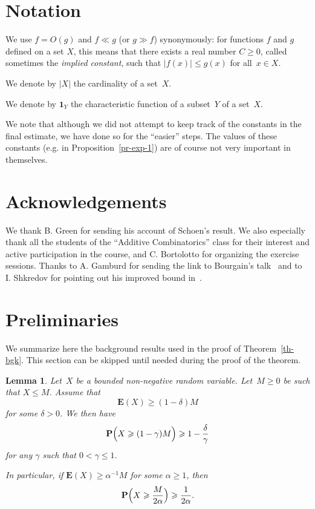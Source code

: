 \documentclass[12pt]{amsart}
\renewcommand{\leq}{\leqslant}
\renewcommand{\geq}{\geqslant}
\numberwithin{equation}{section}
\newcommand{\proba}{\mathbf{P}}
\newcommand{\expect}{\mathbf{E}}
\newcommand{\charfun}{\mathbf{1}}
\theoremstyle{plain}
\newtheorem{lemma}[theorem]{Lemma}
\theoremstyle{remark}
\theoremstyle{definition}
\renewcommand{\geq}{\geqslant}
\renewcommand{\leq}{\leqslant}
\begin{document}
\section*{Notation} We use $f=O(g)$ and $f\ll g$ (or $g\gg f$)
synonymously: for functions $f$ and $g$ defined on a set $X$, this means
that there exists a real number $C\geq 0$, called sometimes the
\emph{implied constant}, such that $|f(x)|\leq g(x)$ for all~$x\in X$.

We denote by $|X|$ the cardinality of a set~$X$.

We denote by $\charfun_Y$ the characteristic function of a subset~$Y$ of
a set~$X$.

We note that although we did not attempt to keep track of the constants
in the final estimate, we have done so for the ``easier'' steps.  The
values of these constants (e.g. in Proposition~\ref{pr-exp-1}) are of
course not very important in themselves.

\section*{Acknowledgements}

We thank B. Green for sending his account of Schoen's result. We also
especially thank all the students of the ``Additive Combinatorics''
class for their interest and active participation in the course, and
C. Bortolotto for organizing the exercise sessions.  Thanks to
A. Gamburd for sending the link to Bourgain's talk~\cite{bourgain-talk}
and to I. Shkredov for pointing out his improved bound
in~\cite{shkredov}.

\section{Preliminaries}

We summarize here the background results used in the proof of
Theorem~\ref{th-bgk}. This section can be skipped until needed during
the proof of the theorem.

\begin{lemma}\label{lm-proba-lower-bound}
  Let~$X$ be a bounded non-negative random variable. Let~$M\geq 0$
  be such that $X\leq M$. Assume that
  $$
  \expect(X)\geq (1-\delta)M 
  $$
  for some $\delta>0$. We then have
  $$
  \proba\Bigl(X\geq (1-\gamma) M\Bigr)\geq 1-\frac{\delta}{\gamma}
  $$
  for any $\gamma$ such that $0<\gamma\leq 1$.

  In particular, if $\expect(X)\geq \alpha^{-1}M$ for some $\alpha\geq
  1$, then
  \begin{equation}\label{eq-proba-lb}
    \proba\Bigl(X\geq \frac{M}{2\alpha}\Bigr)\geq \frac{1}{2\alpha}.
  \end{equation}
\end{lemma}
\end{document}
